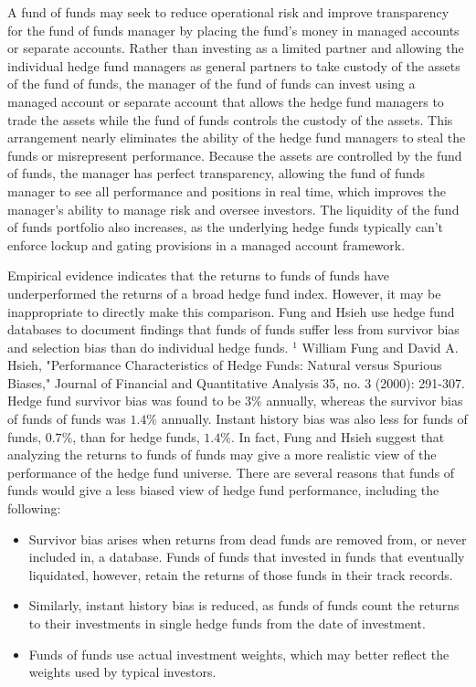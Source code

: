 \documentclass[11pt]{article}
\begin{document}
A fund of funds may seek to reduce operational risk and improve transparency for the fund of funds manager by placing the fund's money in managed accounts or separate accounts. Rather than investing as a limited partner and allowing the individual hedge fund managers as general partners to take custody of the assets of the fund of funds, the manager of the fund of funds can invest using a managed account or separate account that allows the hedge fund managers to trade the assets while the fund of funds controls the custody of the assets. This arrangement nearly eliminates the ability of the hedge fund managers to steal the funds or misrepresent performance. Because the assets are controlled by the fund of funds, the manager has perfect transparency, allowing the fund of funds manager to see all performance and positions in real time, which improves the manager's ability to manage risk and oversee investors. The liquidity of the fund of funds portfolio also increases, as the underlying hedge funds typically can't enforce lockup and gating provisions in a managed account framework.

Empirical evidence indicates that the returns to funds of funds have underperformed the returns of a broad hedge fund index. However, it may be inappropriate to directly make this comparison. Fung and Hsieh use hedge fund databases to document findings that funds of funds suffer less from survivor bias and selection bias than do individual hedge funds. ${ }^{1}$ William Fung and David A. Hsieh, "Performance Characteristics of Hedge Funds: Natural versus Spurious Biases," Journal of Financial and Quantitative Analysis 35, no. 3 (2000): 291-307. Hedge fund survivor bias was found to be $3 \%$ annually, whereas the survivor bias of funds of funds was $1.4 \%$ annually. Instant history bias was also less for funds of funds, $0.7 \%$, than for hedge funds, $1.4 \%$. In fact, Fung and Hsieh suggest that analyzing the returns to funds of funds may give a more realistic view of the performance of the hedge fund universe. There are several reasons that funds of funds would give a less biased view of hedge fund performance, including the following:

\begin{itemize}
  \item Survivor bias arises when returns from dead funds are removed from, or never included in, a database. Funds of funds that invested in funds that eventually liquidated, however, retain the returns of those funds in their track records.
  \item Similarly, instant history bias is reduced, as funds of funds count the returns to their investments in single hedge funds from the date of investment.
  \item Funds of funds use actual investment weights, which may better reflect the weights used by typical investors.
\end{itemize}
\end{document}
